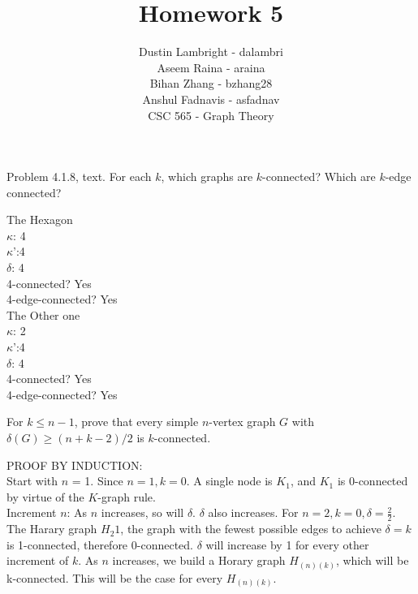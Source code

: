 \documentclass[12pt]{article}
\newenvironment{question}[2][Question]{\begin{trivlist}
\item[\hskip \labelsep {\bfseries #1}\hskip \labelsep {\bfseries #2.}]}{\end{trivlist}}
\begin{document}


\title{Homework 5}%
\author{Dustin Lambright - dalambri \\ Aseem Raina - araina \\ Bihan Zhang - bzhang28 \\ Anshul Fadnavis - asfadnav\\
CSC 565 - Graph Theory} %

\maketitle


\begin{question}{1}
Problem 4.1.8, text. For each $k$, which graphs are $k$-connected? Which are $k$-edge connected?
\end{question}

\noindent
The Hexagon \\
$\kappa$: 4 \\
$\kappa$':4 \\
$\delta$: 4 \\
4-connected? Yes \\
4-edge-connected? Yes  \\
The Other one \\
$\kappa$: 2 \\
$\kappa$':4 \\
$\delta$: 4 \\
4-connected? Yes \\
4-edge-connected? Yes

\begin{question}{2}
For $k \leq n - 1$, prove that every simple $n$-vertex graph $G$ with $\delta(G) \geq (n+k-2)/2$ is $k$-connected.
\end{question}

PROOF BY INDUCTION: \\
Start with $n$ = 1. Since $n = 1, k = 0$. A single node is $K_1$, and $K_1$ is $0$-connected by virtue of the $K$-graph rule. \\

Increment $n$:
As $n$ increases, so will $\delta$.  $\delta$ also increases. For $n = 2, k =0, \delta = \frac{2}{2}$.  The Harary graph $H_{2}{1}$, the graph with the fewest possible edges to achieve $\delta = k$ is 1-connected, therefore 0-connected.  $\delta$ will increase by 1 for every other increment of $k$. As $n$ increases, we build a Horary graph $H_{(n)(k)}$, which will be k-connected.  This will be the case for every $H_{(n)(k)}$.
\end{document}
